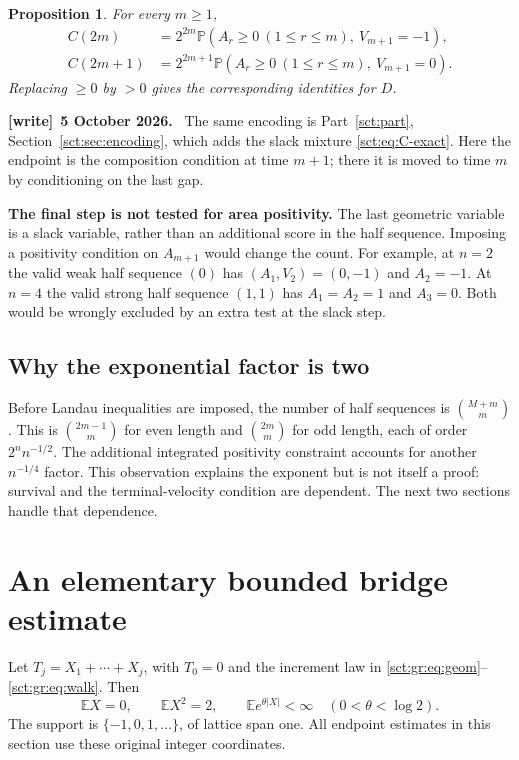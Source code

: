 \documentclass[11pt,letterpaper]{article}
\newtheorem{proposition}[theorem]{Proposition}
\theoremstyle{definition}\newtheorem{remark}[theorem]{Remark}
\newcommand{\Pp}{\mathbb P}\newcommand{\Ee}{\mathbb E}
\newenvironment{writenote}[1][]{\par\smallskip\begingroup\small
 \noindent\textbf{[write]}\if\relax\detokenize{#1}\relax\else~\textbf{#1.}\fi\ }%
 {\par\endgroup\smallskip}
\begin{document}
\begin{proposition}\label{sct:gr:prop:exact}
For every $m\ge1$,
\begin{align}
 C(2m)&=2^{2m}\Pp(A_r\ge0\ (1\le r\le m),\ V_{m+1}=-1),\label{sct:gr:eq:Ceven}\\
 C(2m+1)&=2^{2m+1}\Pp(A_r\ge0\ (1\le r\le m),\ V_{m+1}=0).\label{sct:gr:eq:Codd}
\end{align}
Replacing $\ge0$ by $>0$ gives the corresponding identities for $D$.
\end{proposition}
\begin{writenote}[5 October 2026]
The same encoding is Part~\ref{sct:part}, Section~\ref{sct:sec:encoding}, which adds the slack mixture \eqref{sct:eq:C-exact}. Here the endpoint is the composition condition at time $m+1$; there it is moved to time $m$ by conditioning on the last gap.
\end{writenote}

\textbf{The final step is not tested for area positivity.}
The last geometric variable is a slack variable, rather than an additional
score in the half sequence. Imposing a positivity condition on $A_{m+1}$
would change the count. For example, at $n=2$ the valid weak half sequence
$(0)$ has $(A_1,V_2)=(0,-1)$ and $A_2=-1$. At $n=4$ the valid strong half
sequence $(1,1)$ has $A_1=A_2=1$ and $A_3=0$. Both would be wrongly excluded
by an extra test at the slack step.

\subsection{Why the exponential factor is two}

Before Landau inequalities are imposed, the number of half sequences is
$\binom{M+m}{m}$. This is $\binom{2m-1}{m}$ for even length and
$\binom{2m}{m}$ for odd length, each of order $2^n n^{-1/2}$.
The additional integrated positivity constraint accounts for another
$n^{-1/4}$ factor. This observation explains the exponent but is not itself
a proof: survival and the terminal-velocity condition are dependent. The next
two sections handle that dependence.

\section{An elementary bounded bridge estimate}\label{sct:gr:sec:bridge}

Let $T_j=X_1+\cdots+X_j$, with $T_0=0$ and the increment law in
\eqref{sct:gr:eq:geom}--\eqref{sct:gr:eq:walk}. Then
\begin{equation}\label{sct:gr:eq:moments}
 \Ee X=0,\qquad \Ee X^2=2,\qquad
 \Ee e^{\theta|X|}<\infty\quad(0<\theta<\log2).
\end{equation}
The support is $\{-1,0,1,\ldots\}$, of lattice span one. All endpoint estimates
in this section use these original integer coordinates.
\end{document}
